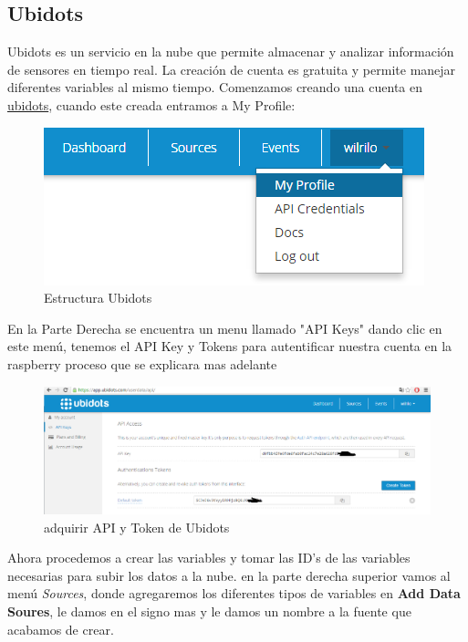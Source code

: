 \documentclass[10pt]{article}\usepackage[]{graphicx}\usepackage[]{color}
\begin{document}
	
\subsection{Ubidots}

Ubidots es un servicio en la nube que permite almacenar y analizar información de sensores en tiempo real. La creación de cuenta es gratuita y permite manejar diferentes variables al mismo tiempo. Comenzamos creando una cuenta en \href{http://ubidots.com/}{ubidots}, cuando este creada entramos a My Profile:

	\begin{figure}[ht] %
		\centering
		\includegraphics[scale=0.5]{ubi1}   %
		\caption{Estructura Ubidots}
		
	\end{figure}

En la Parte Derecha se encuentra un menu llamado "API Keys" dando clic en este menú, tenemos el API Key y Tokens para autentificar nuestra cuenta en la raspberry proceso que se explicara mas adelante   
  
 	\begin{figure}[ht]
 		\centering
 		\includegraphics[scale=0.3]{ubi2}   %
 		\caption{adquirir API y Token de Ubidots} 		
 	\end{figure}

Ahora procedemos a crear las variables y tomar las ID's de las variables necesarias para subir los datos a la nube. en la parte derecha superior vamos al menú \textit{Sources}, donde agregaremos los diferentes tipos de variables en \textbf{Add Data Soures}, le damos en el signo mas y le damos un nombre a la fuente que acabamos de crear.
  
\end{document}
